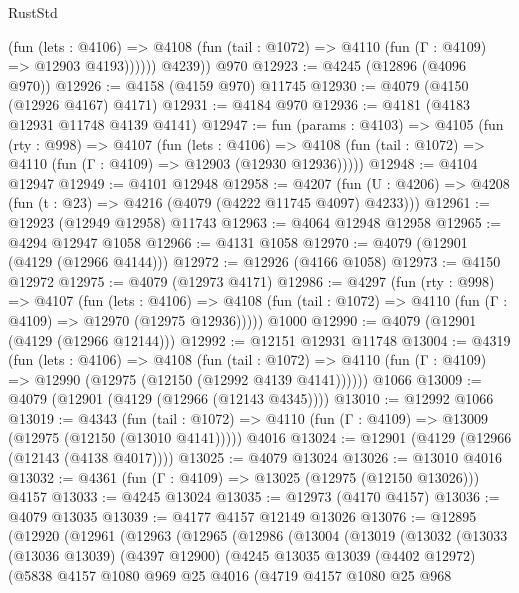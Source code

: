 \begin{lexlean}{RustStd}
\begin{coremodule}
              (fun (lets : @4106) =>
              @4108 (fun (tail : @1072) => @4110 (fun (Γ : @4109) => @12903 @4193))))))
        @4239))
    @970
@12923 := @4245 (@12896 (@4096 @970))
@12926 := @4158 (@4159 @970) @11745
@12930 := @4079 (@4150 (@12926 @4167) @4171)
@12931 := @4184 @970
@12936 := @4181 (@4183 @12931 @11748 @4139 @4141)
@12947 := fun (params : @4103) =>
  @4105
    (fun (rty : @998) =>
    @4107
      (fun (lets : @4106) =>
      @4108 (fun (tail : @1072) => @4110 (fun (Γ : @4109) => @12903 (@12930 @12936)))))
@12948 := @4104 @12947
@12949 := @4101 @12948
@12958 := @4207
    (fun (U : @4206) => @4208 (fun (t : @23) => @4216 (@4079 (@4222 @11745 @4097) @4233)))
@12961 := @12923 (@12949 @12958) @11743
@12963 := @4064 @12948 @12958
@12965 := @4294 @12947 @1058
@12966 := @4131 @1058
@12970 := @4079 (@12901 (@4129 (@12966 @4144)))
@12972 := @12926 (@4166 @1058)
@12973 := @4150 @12972
@12975 := @4079 (@12973 @4171)
@12986 := @4297
    (fun (rty : @998) =>
    @4107
      (fun (lets : @4106) =>
      @4108 (fun (tail : @1072) => @4110 (fun (Γ : @4109) => @12970 (@12975 @12936)))))
    @1000
@12990 := @4079 (@12901 (@4129 (@12966 @12144)))
@12992 := @12151 @12931 @11748
@13004 := @4319
    (fun (lets : @4106) =>
    @4108
      (fun (tail : @1072) =>
      @4110 (fun (Γ : @4109) => @12990 (@12975 (@12150 (@12992 @4139 @4141))))))
    @1066
@13009 := @4079 (@12901 (@4129 (@12966 (@12143 @4345))))
@13010 := @12992 @1066
@13019 := @4343
    (fun (tail : @1072) => @4110 (fun (Γ : @4109) => @13009 (@12975 (@12150 (@13010 @4141)))))
    @4016
@13024 := @12901 (@4129 (@12966 (@12143 (@4138 @4017))))
@13025 := @4079 @13024
@13026 := @13010 @4016
@13032 := @4361 (fun (Γ : @4109) => @13025 (@12975 (@12150 @13026))) @4157
@13033 := @4245 @13024
@13035 := @12973 (@4170 @4157)
@13036 := @4079 @13035
@13039 := @4177 @4157 @12149 @13026
@13076 := @12895
    (@12920
      (@12961
        (@12963
          (@12965
            (@12986
              (@13004
                (@13019
                  (@13032
                    (@13033
                      (@13036 @13039)
                      (@4397 @12900)
                      (@4245
                        @13035
                        @13039
                        (@4402 @12972)
                        (@5838
                          @4157
                          @1080
                          @969
                          @25
                          @4016
                          (@4719
                            @4157
                            @1080
                            @25
                            @968

\end{coremodule}
\end{lexlean}
